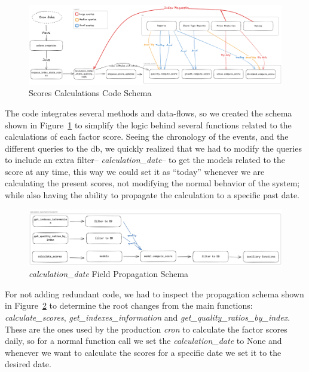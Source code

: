 \documentclass[11pt,english,a4paper,hidelinks]{book}
\begin{document}
\begin{figure}[H]
    \centering
    \includegraphics[width=1\textwidth]{images/tweenvest/scores schema.png}
    \caption{Scores Calculations Code Schema}
    \label{fig:scores_schema}
\end{figure}

\noindent The code integrates several methods and data-flows, so we created the schema shown in Figure~\ref{fig:scores_schema} to simplify the logic behind several functions related to the calculations of each factor score. Seeing the chronology of the events, and the different queries to the \acrshort{db}, we quickly realized that we had to modify the queries to include an extra filter-- \textit{calculation\_date}-- to get the models related to the score at any time, this way we could set it as ``today'' whenever we are calculating the present scores, not modifying the normal behavior of the system; while also having the ability to propagate the calculation to a specific past date.

\begin{figure}[H]
    \centering
    \includegraphics[width=1\textwidth]{images/tweenvest/Propagation Schema.png}
    \caption{\textit{calculation\_date} Field Propagation Schema}
    \label{fig:propagation_schema}
\end{figure}

\vspace{0.5cm}
\noindent For not adding redundant code, we had to inspect the propagation schema shown in Figure~\ref{fig:propagation_schema} to determine the root changes from the main functions: \textit{calculate\_scores}, \textit{get\_indexes\_information} and \textit{get\_quality\_ratios\_by\_index}. These are the ones used by the production \textit{\acrshort{cron}} to calculate the factor scores daily, so for a normal function call we set the \textit{calculation\_date} to None and whenever we want to calculate the scores for a specific date we set it to the desired date. 
\end{document}
